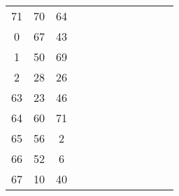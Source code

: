 \begin{table}[tb]
\begin{tabular}{|c|c|c|lllllllll}
	71 & 70 & 64 &                         &                         &                         &                         &                         &                         &                         &                         &                         \\ \cline{1-3}
	0  & 67 & 43 &                         &                         &                         &                         &                         &                         &                         &                         &                         \\ \cline{1-3}
	1  & 50 & 69 &                         &                         &                         &                         &                         &                         &                         &                         &                         \\ \cline{1-3}
	2  & 28 & 26 &                         &                         &                         &                         &                         &                         &                         &                         &                         \\ \cline{1-3}
	63 & 23 & 46 &                         &                         &                         &                         &                         &                         &                         &                         &                         \\ \cline{1-3}
	64 & 60 & 71 &                         &                         &                         &                         &                         &                         &                         &                         &                         \\ \cline{1-3}
	65 & 56 & 2  &                         &                         &                         &                         &                         &                         &                         &                         &                         \\ \cline{1-3}
	66 & 52 & 6  &                         &                         &                         &                         &                         &                         &                         &                         &                         \\ \cline{1-3}
	67 & 10 & 40 &                         &                         &                         &                         &                         &                         &                         &                         &                         \\ \cline{1-3}

\end{tabular}
\end{table}
